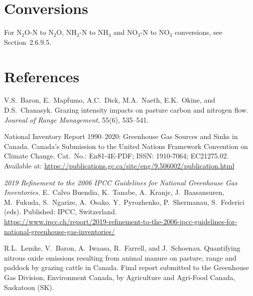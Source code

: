 \section{Conversions}
\label{sec:grazing-conversions}

For N$_2$O-N to N$_2$O, NH$_3$-N to NH$_3$ and NO$_3$-N to NO$_3$ conversions,
see Section~2.6.9.5.

\section{References}
\label{sec:grazing-references}

\begin{description}[leftmargin=0pt, style=nextline]

    \item[Baron et al., 2002]
        V.S.\ Baron, E.\ Mapfumo, A.C.\ Dick, M.A.\ Naeth, E.K.\ Okine, and
        D.S.\ Chanasyk.
        Grazing intensity impacts on pasture carbon and nitrogen flow.
        \textit{Journal of Range Management}, 55(6), 535--541.

    \item[ECCC, 2022]
        National Inventory Report 1990--2020: Greenhouse Gas Sources and Sinks
        in Canada. Canada's Submission to the United Nations Framework
        Convention on Climate Change. Cat.\ No.: En81-4E-PDF; ISSN: 1910-7064;
        EC21275.02. Available at:
        \url{https://publications.gc.ca/site/eng/9.506002/publication.html}

    \item[IPCC, 2019]
        \textit{2019 Refinement to the 2006 IPCC Guidelines for National
        Greenhouse Gas Inventories.} E.\ Calvo Buendia, K.\ Tanabe,
        A.\ Kranjc, J.\ Baasansuren, M.\ Fukuda, S.\ Ngarize, A.\ Osako,
        Y.\ Pyrozhenko, P.\ Shermanau, S.\ Federici (eds). Published: IPCC,
        Switzerland.\\
        \url{https://www.ipcc.ch/report/2019-refinement-to-the-2006-ipcc-guidelines-for-national-greenhouse-gas-inventories/}

    \item[Lemke et al., 2012]
        R.L.\ Lemke, V.\ Baron, A.\ Iwaasa, R.\ Farrell, and J.\ Schoenau.
        Quantifying nitrous oxide emissions resulting from animal manure on
        pasture, range and paddock by grazing cattle in Canada. Final report
        submitted to the Greenhouse Gas Division, Environment Canada, by
        Agriculture and Agri-Food Canada, Saskatoon (SK).


\end{description}
